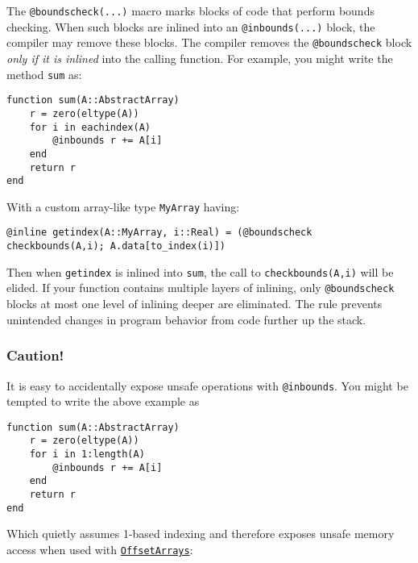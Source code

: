The \texttt{@boundscheck(...)} macro marks blocks of code that perform bounds checking. When such blocks are inlined into an \texttt{@inbounds(...)} block, the compiler may remove these blocks. The compiler removes the \texttt{@boundscheck} block \emph{only if it is inlined} into the calling function. For example, you might write the method \texttt{sum} as:




\begin{verbatim}
function sum(A::AbstractArray)
    r = zero(eltype(A))
    for i in eachindex(A)
        @inbounds r += A[i]
    end
    return r
end
\end{verbatim}



With a custom array-like type \texttt{MyArray} having:




\begin{verbatim}
@inline getindex(A::MyArray, i::Real) = (@boundscheck checkbounds(A,i); A.data[to_index(i)])
\end{verbatim}



Then when \texttt{getindex} is inlined into \texttt{sum}, the call to \texttt{checkbounds(A,i)} will be elided. If your function contains multiple layers of inlining, only \texttt{@boundscheck} blocks at most one level of inlining deeper are eliminated. The rule prevents unintended changes in program behavior from code further up the stack.



\hypertarget{13791305586943178951}{}


\subsubsection{Caution!}



It is easy to accidentally expose unsafe operations with \texttt{@inbounds}. You might be tempted to write the above example as




\begin{verbatim}
function sum(A::AbstractArray)
    r = zero(eltype(A))
    for i in 1:length(A)
        @inbounds r += A[i]
    end
	return r
end
\end{verbatim}



Which quietly assumes 1-based indexing and therefore exposes unsafe memory access when used with \hyperlink{6526948166346290584}{\texttt{OffsetArrays}}:




